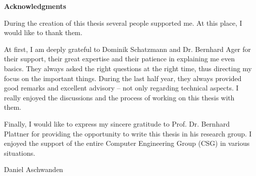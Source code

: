 

\clearpage 
\begin{center}
	\textbf{Acknowledgments} 
\end{center}

During the creation of this thesis several people supported me. At this place, I would like to thank them.

At first, I am deeply grateful to Dominik Schatzmann and Dr. Bernhard Ager for their support, their great expertise and their patience in explaining me even basics. They always asked the right questions at the right time, thus directing my focus on the important things. During the last half year, they always provided good remarks and excellent advisory -- not only regarding technical aspects. I really enjoyed the discussions and the process of working on this thesis with them. 

Finally, I would like to express my sincere gratitude to Prof. Dr. Bernhard Plattner for providing the opportunity to write this thesis in his research group. I enjoyed the support of the entire Computer Engineering Group (CSG) in various situations.


\vspace{2cm} Daniel Aschwanden 
\vfil

